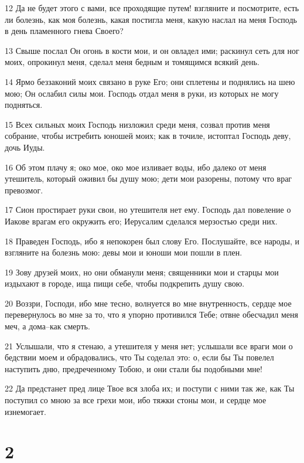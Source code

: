\par 12 Да не будет этого с вами, все проходящие путем! взгляните и посмотрите, есть ли болезнь, как моя болезнь, какая постигла меня, какую наслал на меня Господь в день пламенного гнева Своего?
\par 13 Свыше послал Он огонь в кости мои, и он овладел ими; раскинул сеть для ног моих, опрокинул меня, сделал меня бедным и томящимся всякий день.
\par 14 Ярмо беззаконий моих связано в руке Его; они сплетены и поднялись на шею мою; Он ослабил силы мои. Господь отдал меня в руки, из которых не могу подняться.
\par 15 Всех сильных моих Господь низложил среди меня, созвал против меня собрание, чтобы истребить юношей моих; как в точиле, истоптал Господь деву, дочь Иуды.
\par 16 Об этом плачу я; око мое, око мое изливает воды, ибо далеко от меня утешитель, который оживил бы душу мою; дети мои разорены, потому что враг превозмог.
\par 17 Сион простирает руки свои, но утешителя нет ему. Господь дал повеление о Иакове врагам его окружить его; Иерусалим сделался мерзостью среди них.
\par 18 Праведен Господь, ибо я непокорен был слову Его. Послушайте, все народы, и взгляните на болезнь мою: девы мои и юноши мои пошли в плен.
\par 19 Зову друзей моих, но они обманули меня; священники мои и старцы мои издыхают в городе, ища пищи себе, чтобы подкрепить душу свою.
\par 20 Воззри, Господи, ибо мне тесно, волнуется во мне внутренность, сердце мое перевернулось во мне за то, что я упорно противился Тебе; отвне обесчадил меня меч, а дома--как смерть.
\par 21 Услышали, что я стенаю, а утешителя у меня нет; услышали все враги мои о бедствии моем и обрадовались, что Ты соделал это: о, если бы Ты повелел наступить дню, предреченному Тобою, и они стали бы подобными мне!
\par 22 Да предстанет пред лице Твое вся злоба их; и поступи с ними так же, как Ты поступил со мною за все грехи мои, ибо тяжки стоны мои, и сердце мое изнемогает.

\chapter{2}

